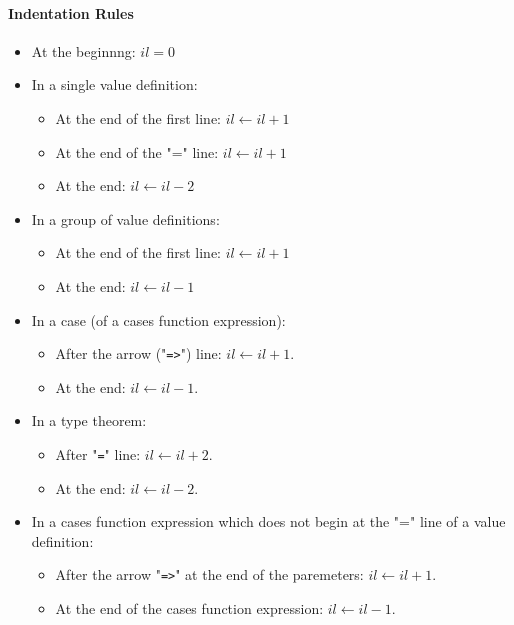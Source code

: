 \documentclass{article}
\begin{document}
\paragraph{Indentation Rules}
\begin{itemize}

\item
At the beginnng: $il = 0$

\item
In a single value definition:
  \begin{itemize}

  \item
  At the end of the first line: $il \leftarrow il + 1$

  \item
  At the end of the "=" line: $il \leftarrow il + 1$

  \item
  At the end: $il \leftarrow il - 2$
  \end{itemize}

\item
In a group of value definitions:
  \begin{itemize}

  \item
  At the end of the first line: $il \leftarrow il + 1$

  \item
  At the end: $il \leftarrow il - 1$
  \end{itemize}

\item
In a case (of a cases function expression):
  \begin{itemize}

  \item
  After the arrow ("\texttt{=>}") line: $il \leftarrow il + 1$.

  \item
  At the end: $il \leftarrow il - 1$.
  \end{itemize}

\item
In a type theorem:
  \begin{itemize}

  \item
  After "\texttt{=}" line: $il \leftarrow il + 2$.

  \item
  At the end: $il \leftarrow il - 2$.
  \end{itemize}

\item
In a cases function expression which does not begin at the "=" line of a value
definition:
  \begin{itemize}

  \item
  After the arrow "\texttt{=>}" at the end of the paremeters: $il \leftarrow il
  + 1$.

  \item
  At the end of the cases function expression: $il \leftarrow il - 1$.

  \end{itemize}

\end{itemize}
\end{document}
